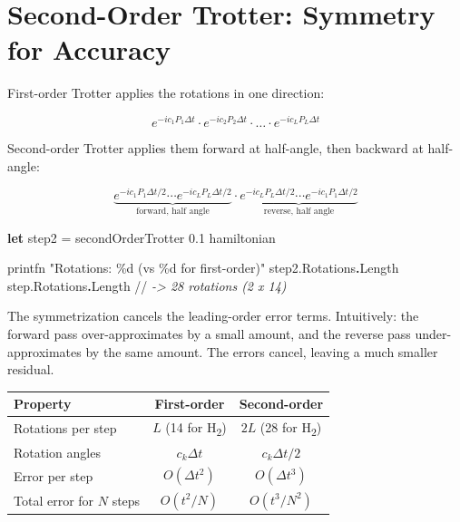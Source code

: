 \documentclass[
  11pt,
  oneside]{book}
\newenvironment{Shaded}{\begin{snugshade}}{\end{snugshade}}
\newcommand{\CommentTok}[1]{\textcolor[rgb]{0.56,0.35,0.01}{\textit{#1}}}
\newcommand{\FloatTok}[1]{\textcolor[rgb]{0.00,0.00,0.81}{#1}}
\newcommand{\KeywordTok}[1]{\textcolor[rgb]{0.13,0.29,0.53}{\textbf{#1}}}
\newcommand{\NormalTok}[1]{#1}
\newcommand{\StringTok}[1]{\textcolor[rgb]{0.31,0.60,0.02}{#1}}
\begin{document}
\section{Second-Order Trotter: Symmetry for
Accuracy}\label{second-order-trotter-symmetry-for-accuracy}

First-order Trotter applies the rotations in one direction:

\[e^{-ic_1 P_1 \Delta t} \cdot e^{-ic_2 P_2 \Delta t} \cdot \ldots \cdot e^{-ic_L P_L \Delta t}\]

Second-order Trotter applies them forward at half-angle, then backward
at half-angle:

\[\underbrace{e^{-ic_1 P_1 \Delta t/2} \cdots e^{-ic_L P_L \Delta t/2}}_{\text{forward, half angle}} \cdot \underbrace{e^{-ic_L P_L \Delta t/2} \cdots e^{-ic_1 P_1 \Delta t/2}}_{\text{reverse, half angle}}\]

\begin{Shaded}
\begin{Highlighting}[]
\KeywordTok{let}\NormalTok{ step2 = secondOrderTrotter }\FloatTok{0.1}\NormalTok{ hamiltonian}

\NormalTok{printfn }\StringTok{"Rotations: \%d (vs \%d for first{-}order)"}
\NormalTok{    step2.Rotations}\KeywordTok{.}\NormalTok{Length}
\NormalTok{    step.Rotations}\KeywordTok{.}\NormalTok{Length}
\NormalTok{//}\CommentTok{ -> 28 rotations (2 x 14)}
\end{Highlighting}
\end{Shaded}

The symmetrization cancels the leading-order error terms. Intuitively:
the forward pass over-approximates by a small amount, and the reverse
pass under-approximates by the same amount. The errors cancel, leaving a
much smaller residual.

\begin{longtable}[]{@{}lcc@{}}
\toprule\noalign{}
Property & First-order & Second-order \\
\midrule\noalign{}
\endhead
\bottomrule\noalign{}
\endlastfoot
Rotations per step & \(L\) (14 for H\textsubscript{2}) & \(2L\) (28 for H\textsubscript{2}) \\
Rotation angles & \(c_k \Delta t\) & \(c_k \Delta t / 2\) \\
Error per step & \(O(\Delta t^2)\) & \(O(\Delta t^3)\) \\
Total error for \(N\) steps & \(O(t^2/N)\) & \(O(t^3/N^2)\) \\
\end{longtable}
\end{document}
